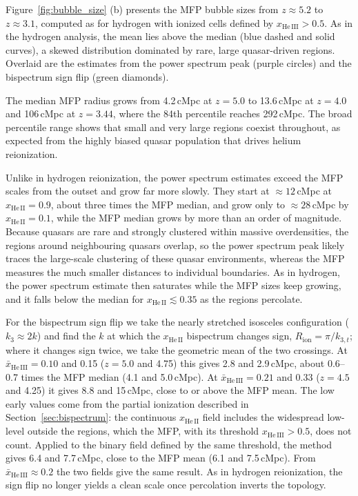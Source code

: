 
Figure~\ref{fig:bubble_size} (b) presents the MFP  bubble sizes from $z \approx 5.2$ to $z \approx 3.1$, computed as for hydrogen with ionized cells defined by $x_\mathrm{He\,III} > 0.5$. As in the hydrogen analysis, the mean lies above the median (blue dashed and solid curves), a skewed distribution dominated by rare, large quasar-driven regions. Overlaid are the estimates from the power spectrum peak (purple circles) and the bispectrum sign flip (green diamonds).

The median MFP radius grows from 4.2\,cMpc at $z = 5.0$ to 13.6\,cMpc at $z = 4.0$ and 106\,cMpc at $z = 3.44$, where the 84th percentile reaches 292\,cMpc. The broad percentile range shows that small and very large  regions coexist throughout, as expected from the highly biased quasar population that drives helium reionization.

Unlike in hydrogen reionization, the power spectrum estimates exceed the MFP scales from the outset and grow far more slowly. They start at $\approx 12$\,cMpc at $x_\mathrm{He\,II} = 0.9$, about three times the MFP median, and grow only to $\approx 28$\,cMpc by $x_\mathrm{He\,II} = 0.1$, while the MFP median grows by more than an order of magnitude. Because quasars are rare and strongly clustered within massive overdensities, the  regions around neighbouring quasars overlap, so the power spectrum peak likely traces the large-scale clustering of these quasar environments, whereas the MFP measures the much smaller distances to individual  boundaries. As in hydrogen, the power spectrum estimate then saturates while the MFP sizes keep growing, and it falls below the median for $x_\mathrm{He\,II} \lesssim 0.35$ as the  regions percolate.

For the bispectrum sign flip we take the nearly stretched isosceles configuration ($k_3 \approx 2k$) and find the $k$ at which the $x_\mathrm{He\,II}$ bispectrum changes sign, $R_\mathrm{ion} = \pi/k_{3,t}$; where it changes sign twice, we take the geometric mean of the two crossings. At $\bar{x}_\mathrm{He\,III} = 0.10$ and 0.15 ($z = 5.0$ and 4.75) this gives 2.8 and 2.9\,cMpc, about 0.6--0.7 times the MFP median (4.1 and 5.0\,cMpc). At $\bar{x}_\mathrm{He\,III} = 0.21$ and 0.33 ($z = 4.5$ and 4.25) it gives 8.8 and 15\,cMpc, close to or above the MFP mean. The low early values come from the partial ionization described in Section~\ref{sec:bispectrum}: the continuous $x_\mathrm{He\,II}$ field includes the widespread low-level  outside the  regions, which the MFP, with its threshold $x_\mathrm{He\,III} > 0.5$, does not count. Applied to the binary field defined by the same threshold, the method gives 6.4 and 7.7\,cMpc, close to the MFP mean (6.1 and 7.5\,cMpc). From $\bar{x}_\mathrm{He\,III} \approx 0.2$ the two fields give the same result. As in hydrogen reionization, the sign flip no longer yields a clean  scale once percolation inverts the topology.

